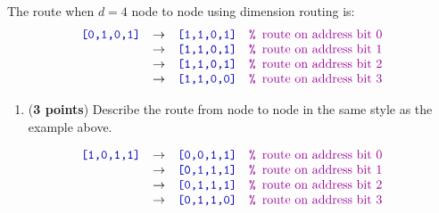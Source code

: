 \documentclass{article}
\newenvironment{answer}
{\color{blue}}
{\normalfont}
\newcounter{enumiisave}
\begin{document}
\begin{enumerate}
          The route when $d=4$ node \code{[0,1,0,1]} to node \code{[1,1,0,0]} using dimension routing is:
          \begin{displaymath}\begin{array}{rcll}
                  \code{[0,1,0,1]} & \rightarrow & \code{[1,1,0,1]} & \code{\xcomment{route on address bit 0}} \\
                                   & \rightarrow & \code{[1,1,0,1]} & \code{\xcomment{route on address bit 1}} \\
                                   & \rightarrow & \code{[1,1,0,1]} & \code{\xcomment{route on address bit 2}} \\
                                   & \rightarrow & \code{[1,1,0,0]} & \code{\xcomment{route on address bit 3}}
              \end{array}\end{displaymath}
          \begin{enumerate}
              \item (\textbf{3 points})\setcounter{enumiisave}{\value{enumii}}
                    Describe the route from node \code{[1,0,1,1]} to node \code{[0,1,1,0]} in
                    the same style as the example above.
          \end{enumerate}

          \begin{answer}
              \begin{displaymath}\begin{array}{rcll}
                      \code{[1,0,1,1]} & \rightarrow & \code{[0,0,1,1]} & \code{\xcomment{route on address bit 0}} \\
                                       & \rightarrow & \code{[0,1,1,1]} & \code{\xcomment{route on address bit 1}} \\
                                       & \rightarrow & \code{[0,1,1,1]} & \code{\xcomment{route on address bit 2}} \\
                                       & \rightarrow & \code{[0,1,1,0]} & \code{\xcomment{route on address bit 3}}
                  \end{array}\end{displaymath}
          \end{answer}


\end{enumerate}
\end{document}
